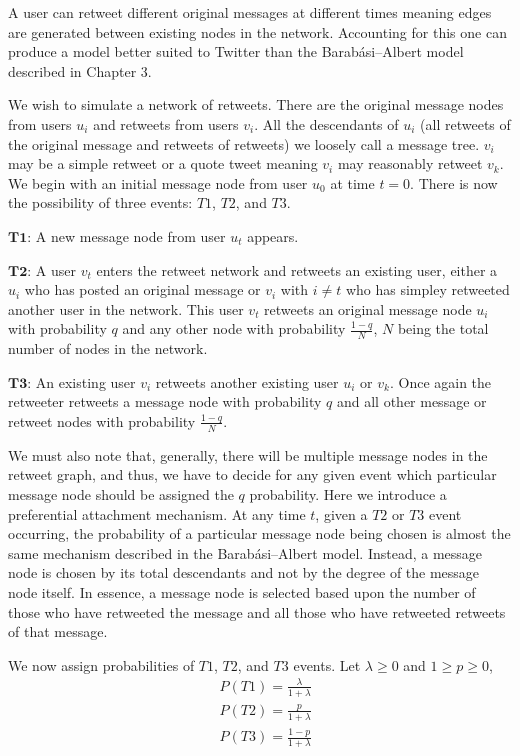 A user can retweet different original messages at different times meaning edges are generated between
existing nodes in the network. Accounting for this one can produce
a model better suited to Twitter than the Barabási–Albert model described in Chapter 3.

We wish to simulate a network of retweets. There are the original message nodes from users $u_i$ and retweets from users $v_i$. All the descendants of $u_i$ (all retweets of the original message and retweets of retweets)
we loosely call a message tree. $v_i$ may be a simple retweet or a quote tweet meaning 
$v_i$ may reasonably retweet $v_k$.
 We begin with an initial message node from user $u_{0}$ at time $t=0$. There is now the possibility of three events: $T1$,
$T2$, and $T3$.

\vspace{3mm}
$\pmb{T1}$: A new message node from user $u_t$ appears.

\vspace{3mm}
$\pmb{T2}$: A user $v_t$ enters the retweet network and retweets an existing user, either a $u_i$ who has posted an original message or $v_i$ with $i \neq t$ who
has simpley retweeted another user in the network. This user $v_t$ retweets an original message node $u_i$ with 
probability $q$ and any other node with probability $\frac{1-q}{N}$, $N$ being the total number of nodes in the network.

\vspace{3mm}
$\pmb{T3}$: An existing user $v_i$ retweets another existing user $u_i$ or $v_k$. Once again the retweeter retweets a message node with probability 
$q$ and all other message or retweet nodes with probability $\frac{1-q}{N}$.

We must also note that, generally, there will be multiple message nodes in the retweet graph, and thus,
 we have to decide for any given event
which particular message node should be assigned the $q$ probability.
 Here we introduce a preferential attachment mechanism. At any time $t$,
given a $T2$ or $T3$ event occurring, the probability of a particular message node being chosen is almost the
same mechanism described in the Barabási–Albert model. Instead, a message node is chosen
by its total descendants and not by the degree of the message node itself. In essence, a message node
is selected based upon the number of those who have retweeted the message and all those who have retweeted
retweets of that message.


We now assign probabilities of $T1$, $T2$, and $T3$ events. Let $\lambda \geq 0$ and $1 \geq p \geq 0$,
\begin{align*}
    &P(T1) = \frac{\lambda}{1 + \lambda} \\
    &P(T2) = \frac{p}{1 + \lambda} \\
    &P(T3) = \frac{1-p}{1 + \lambda} \\
\end{align*}


